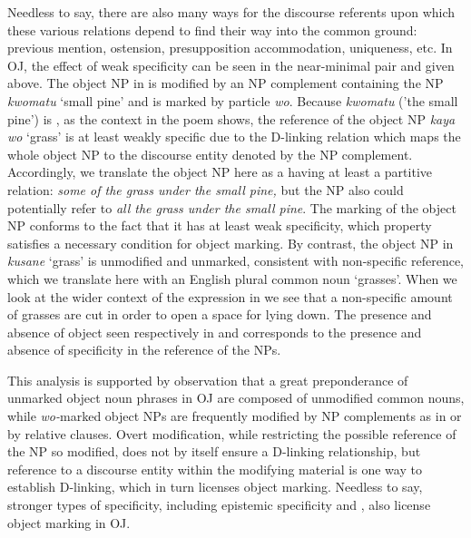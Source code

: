 \documentclass[output=paper]{LSP/langsci}
\begin{document}
Needless to say, there are also many ways for the  discourse
referents upon which these various relations depend to find their way
into the common ground: previous mention, ostension, presupposition
accommodation, uniqueness, etc. In OJ, the effect of weak specificity
can be seen in the near-minimal pair  and  given above. The object NP
in  is modified by an NP complement containing the NP
\textit{kwomatu} ‘small pine’ and is marked by 
particle \textit{wo}. Because \textit{kwomatu} ('the small pine') is
, as the context in the poem shows, the reference of the
object NP \textit{kaya wo} ‘grass’ is at least weakly specific due to
the D-linking relation which maps the whole object NP to the 
discourse entity denoted by the NP complement. Accordingly, we
translate the object NP here as a having at least a partitive
relation: \textit{some of the grass under the small pine,} but the NP
also could potentially refer to \textit{all the grass under the small
 pine}. The marking of the object NP conforms to the fact that it has
at least weak specificity, which property satisfies a necessary
condition for object marking. By contrast, the object NP in  
\textit{kusane} ‘grass’ is unmodified and unmarked, consistent with
non-specific reference, which we translate here with an English plural
common noun ‘grasses’. When we look at the wider context of the
expression in  we see that a non-specific amount of grasses are cut
in order to open a space for lying down. The presence and absence of
object  seen respectively in  and  corresponds to the presence and absence of specificity in the reference of the NPs.

This analysis is supported by  observation that a
great preponderance of unmarked object noun phrases in OJ  are composed
of unmodified common nouns, while \textit{wo-}marked object NPs are
frequently modified by NP complements as in  or by relative
clauses. Overt modification, while restricting the possible reference
of the NP so modified, does not by itself ensure a D-linking
relationship, but reference to a  discourse entity within the
modifying material is one way to establish D-linking, which in turn
licenses object marking. Needless to say, stronger types of
specificity, including epistemic specificity and , also
license object marking in OJ.
\end{document}
